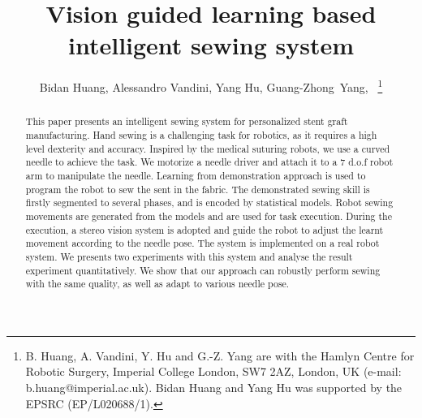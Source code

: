 \documentclass[letterpaper, 10 pt, conference]{ieeeconf}  %
\title{\LARGE \bf
{Vision guided learning based intelligent sewing system}
}
\author{Bidan Huang,
        Alessandro Vandini,
        Yang Hu,
        Guang-Zhong~Yang,~\IEEEmembership{Fellow,~IEEE}
\thanks{B. Huang, A. Vandini, Y. Hu and G.-Z. Yang are with the Hamlyn Centre for Robotic Surgery, Imperial College London, SW7 2AZ, London, UK (e-mail: b.huang@imperial.ac.uk). Bidan Huang and Yang Hu was supported by the EPSRC (EP/L020688/1).
}}
\begin{document}
\maketitle
\thispagestyle{empty}
\pagestyle{empty}

\begin{abstract}
This paper presents an intelligent sewing system for personalized stent graft manufacturing. Hand sewing is a challenging task for robotics, as it requires a high level dexterity and accuracy. Inspired by the medical suturing robots, we use a curved needle to achieve the task. We motorize a needle driver and attach it to a 7 d.o.f robot arm to manipulate the needle. Learning from demonstration approach is used to program the robot to sew the sent in the fabric. The demonstrated sewing skill is firstly segmented to several phases, and is encoded by statistical models. Robot sewing movements are generated from the models and are used for task execution. During the execution, a stereo vision system is adopted and guide the robot to adjust the learnt movement according to the needle pose. The system is implemented on a real robot system. We presents two experiments with this system and analyse the result experiment quantitatively. We show that our approach can robustly perform sewing with the same quality, as well as adapt to various needle pose.
\end{abstract}











\end{document}
